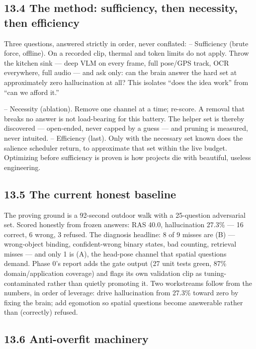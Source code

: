 \subsection{13.4 The method: sufficiency, then necessity, then efficiency}\label{the-method-sufficiency-then-necessity-then-efficiency}

Three questions, answered strictly in order, never conflated: -- Sufficiency (brute force, offline). On a recorded clip, thermal and token limits do not apply. Throw the kitchen sink --- deep VLM on every frame, full pose/GPS track, OCR everywhere, full audio --- and ask only: can the brain answer the hard set at approximately zero hallucination at all? This isolates ``does the idea work'' from ``can we afford it.''

-- Necessity (ablation). Remove one channel at a time; re-score. A removal that breaks no answer is not load-bearing for this battery. The helper set is thereby discovered --- open-ended, never capped by a guess --- and pruning is measured, never intuited. -- Efficiency (last). Only with the necessary set known does the salience scheduler return, to approximate that set within the live budget. Optimizing before sufficiency is proven is how projects die with beautiful, useless engineering.

\subsection{13.5 The current honest baseline}\label{the-current-honest-baseline}

The proving ground is a 92-second outdoor walk with a 25-question adversarial set. Scored honestly from frozen answers: RAS 40.0, hallucination 27.3\% --- 16 correct, 6 wrong, 3 refused. The diagnosis headline: 8 of 9 misses are (B) --- wrong-object binding, confident-wrong binary states, bad counting, retrieval misses --- and only 1 is (A), the head-pose channel that spatial questions demand. Phase 0's report adds the gate output (27 unit tests green, 87\% domain/application coverage) and flags its own validation clip as tuning-contaminated rather than quietly promoting it. Two workstreams follow from the numbers, in order of leverage: drive hallucination from 27.3\% toward zero by fixing the brain; add egomotion so spatial questions become answerable rather than (correctly) refused.

\subsection{13.6 Anti-overfit machinery}\label{anti-overfit-machinery}

